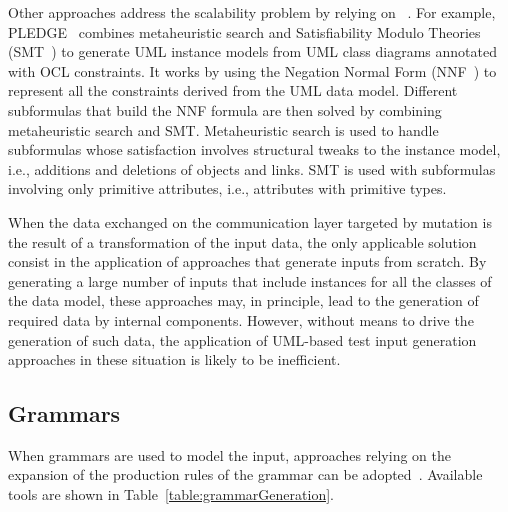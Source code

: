 
Other approaches address the scalability problem by relying on ~\cite{soltana2019practical}.
For example, PLEDGE~\cite{soltana2019practical} combines metaheuristic search and Satisfiability Modulo Theories (SMT~\cite{SMT:2011}) to generate UML instance models from UML class diagrams annotated with OCL constraints. It  works by using the Negation Normal Form (NNF~\cite{NNF:2001}) to represent all the constraints derived from the UML data model. Different subformulas that build the NNF formula are then solved by combining metaheuristic search and SMT. Metaheuristic search is used to handle subformulas whose satisfaction involves structural tweaks to the instance model, i.e., additions and deletions of objects and links. SMT is used with subformulas involving only primitive attributes, i.e., attributes with primitive types. 


When the data exchanged on the communication layer targeted by mutation is the result of a transformation of the input data, the only applicable solution consist in the application of approaches that generate inputs from scratch. By generating a large number of inputs that include instances for all the classes of the data model, these approaches may, in principle, lead to the generation of required data by internal components. However, without means to drive the generation of such data, the application of UML-based test input generation approaches in these situation is likely to be inefficient.


\subsection{Grammars}

When grammars are used to model the input,  approaches relying on the expansion of the production rules of the grammar can be adopted~\cite{fuzzingbook2019:GrammarFuzzer}. 
Available tools are shown in Table~\ref{table:grammarGeneration}.

